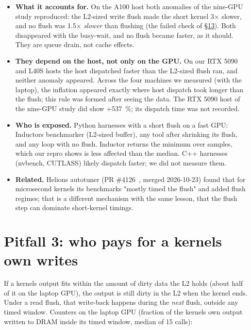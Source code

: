 \documentclass[11pt,a4paper]{article}
\providecommand{\tightlist}{\setlength{\itemsep}{0pt}\setlength{\parskip}{0pt}}
\begin{document}
\begin{itemize}
\tightlist
\item
  \textbf{What it accounts for.} On the A100 host both anomalies of the nine-GPU study reproduced: the L2-sized write flush
  made the short kernel 3\ensuremath{\times} slower, and no flush was 1.5\ensuremath{\times} \emph{slower} than flushing (the failed check of \hyperref[negative-results-deviations-and-limitations]{\S{}13}). Both
  disappeared with the busy-wait, and no flush became faster, as it should. They are queue drain, not cache
  effects.
\item
  \textbf{They depend on the host, not only on the GPU.} On our RTX 5090 and L40S hosts the host dispatched faster than
  the L2-sized flush ran, and neither anomaly appeared. Across the four machines we measured (with the laptop),
  the inflation appeared exactly where host dispatch took longer than the flush; this rule was formed after seeing
  the data. The RTX 5090 host of the nine-GPU study did show +537~\%; its dispatch time was not recorded.
\item
  \textbf{Who is exposed.} Python harnesses with a short flush on a fast GPU: Inductor\textquotesingle s benchmarker (L2-sized buffer),
  any tool after shrinking its flush, and any loop with no flush. Inductor returns the minimum over samples, which
  our repro shows is less affected than the median. C++ harnesses (nvbench, CUTLASS) likely dispatch faster; we
  did not measure them.
\item
  \textbf{Related.} Helion\textquotesingle s autotuner (PR \#4126~\cite{helion4126}, merged 2026-10-23) found that for microsecond kernels its benchmarks
  "mostly timed the flush" and added flush regimes; that is a different mechanism with the same lesson, that the
  flush step can dominate short-kernel timings.
\end{itemize}

\section{Pitfall 3: who pays for a kernel\textquotesingle s own writes}\label{pitfall-3-who-pays-for-a-kernels-own-writes}

If a kernel\textquotesingle s output fits within the amount of dirty data the L2 holds (about half of it on the laptop GPU), the
output is still dirty in the L2 when the kernel ends. Under a read flush, that
write-back happens during the \emph{next} flush, outside any timed window. Counters on the laptop GPU (fraction of
the kernel\textquotesingle s own output written to DRAM inside its timed window, median of 15 calls):
\end{document}
